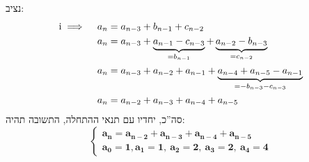 \documentclass[]{article}
\newcommand{\rn}[1]{
	\textup{\uppercase\expandafter{\romannumeral#1}}
}
\begin{document}
	נציב: 
	\begin{alignat*}{9}
		\rn{1} \implies \: && a_n &= a_{n - 3} + b_{n - 1} + c_{n - 2} \\
		                   && a_n &= a_{n - 3} + \underbrace{a_{n - 1} - c_{n - 3}}_{= b_{n - 1}} + \underbrace{a_{n - 2} - b_{n - 3}}_{= c_{n - 2}} \\
		                   && a_n &= a_{n - 3} + a_{n - 2} + a_{n - 1} + \underbrace{a_{n - 4} + a_{n - 5} - a_{n - 1}}_{= -b_{n - 3} -c_{n - 3} } \\
		                   && a_n &= a_{n - 2} + a_{n - 3} + a_{n - 4} + a_{n - 5}
	\end{alignat*}
	סה''כ, יחדיו עם תנאי ההתחלה, התשובה תהיה: 
	\[ \begin{cases}
		\bm{a_n = a_{n - 2} + a_{n - 3} + a_{n - 4} + a_{n - 5}} \\
		\bm{a_0 = 1, a_1 = 1, \ a_2 = 2, \ a_3 = 2, \ a_4 = 4}
	\end{cases} \]
	
\end{document}
